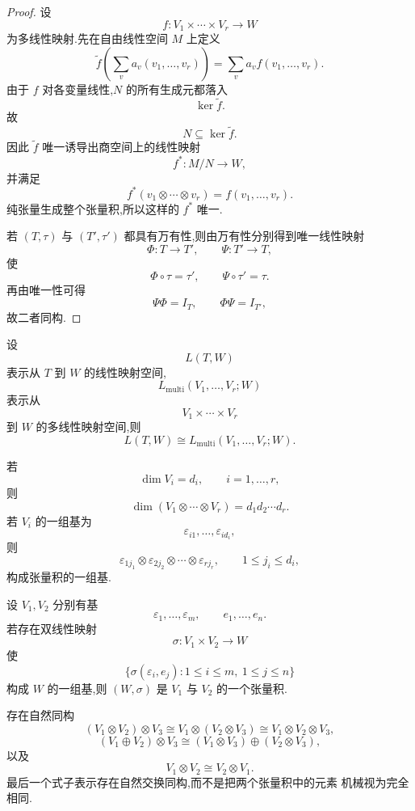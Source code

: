 \begin{proof}
设
\[
f:V_1\times\cdots\times V_r\to W
\]
为多线性映射.先在自由线性空间 $M$ 上定义
\[
\widetilde f
\left(
\sum_v a_v(v_1,\ldots,v_r)
\right)
=
\sum_v a_v f(v_1,\ldots,v_r).
\]
由于 $f$ 对各变量线性,$N$ 的所有生成元都落入
\[
\ker\widetilde f.
\]
故
\[
N\subseteq\ker\widetilde f.
\]
因此 $\widetilde f$ 唯一诱导出商空间上的线性映射
\[
f^*:M/N\to W,
\]
并满足
\[
f^*(v_1\otimes\cdots\otimes v_r)
=
f(v_1,\ldots,v_r).
\]
纯张量生成整个张量积,所以这样的 $f^*$ 唯一.

若 $(T,\tau)$ 与 $(T',\tau')$ 都具有万有性,则由万有性分别得到唯一线性映射
\[
\Phi:T\to T',
\qquad
\Psi:T'\to T,
\]
使
\[
\Phi\circ\tau=\tau',
\qquad
\Psi\circ\tau'=\tau.
\]
再由唯一性可得
\[
\Psi\Phi=I_T,
\qquad
\Phi\Psi=I_{T'},
\]
故二者同构.
\end{proof}


\begin{corollary}[\markstar]
设
\[
L(T,W)
\]
表示从 $T$ 到 $W$ 的线性映射空间,
\[
L_{\mathrm{multi}}(V_1,\ldots,V_r;W)
\]
表示从
\[
V_1\times\cdots\times V_r
\]
到 $W$ 的多线性映射空间,则
\[
L(T,W)
\cong
L_{\mathrm{multi}}(V_1,\ldots,V_r;W).
\]
\end{corollary}


\begin{theorem}[\markstar]
若
\[
\dim V_i=d_i,
\qquad i=1,\ldots,r,
\]
则
\[
\boxed{
\dim(V_1\otimes\cdots\otimes V_r)
=
d_1d_2\cdots d_r.
}
\]
若 $V_i$ 的一组基为
\[
\varepsilon_{i1},\ldots,\varepsilon_{id_i},
\]
则
\[
\varepsilon_{1j_1}\otimes
\varepsilon_{2j_2}\otimes\cdots\otimes
\varepsilon_{rj_r},
\qquad
1\le j_i\le d_i,
\]
构成张量积的一组基.
\end{theorem}


\begin{proposition}[\markstar]
设 $V_1,V_2$ 分别有基
\[
\varepsilon_1,\ldots,\varepsilon_m,
\qquad
e_1,\ldots,e_n.
\]
若存在双线性映射
\[
\sigma:V_1\times V_2\to W
\]
使
\[
\{\sigma(\varepsilon_i,e_j):
1\le i\le m,\ 1\le j\le n\}
\]
构成 $W$ 的一组基,则 $(W,\sigma)$ 是 $V_1$ 与 $V_2$ 的一个张量积.
\end{proposition}


\begin{theorem}[\markstar]
存在自然同构
\[
(V_1\otimes V_2)\otimes V_3
\cong
V_1\otimes(V_2\otimes V_3)
\cong
V_1\otimes V_2\otimes V_3,
\]
\[
(V_1\oplus V_2)\otimes V_3
\cong
(V_1\otimes V_3)\oplus(V_2\otimes V_3),
\]
以及
\[
V_1\otimes V_2
\cong
V_2\otimes V_1.
\]
最后一个式子表示存在自然交换同构,而不是把两个张量积中的元素
机械视为完全相同.
\end{theorem}


